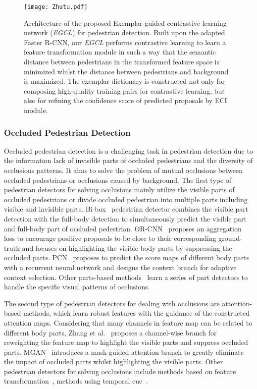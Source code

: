 \documentclass[journal]{IEEEtran}
\begin{document}
\begin{figure*}[t]
\centering
    \texttt{[image: Zhutu.pdf]}
\caption{Architecture of the proposed Exemplar-guided contrastive learning network (\emph{EGCL}) for pedestrian detection. Built upon the adapted Faster R-CNN, our \emph{EGCL} performs contrastive learning to learn a feature transformation module  in such a way that the semantic distance between pedestrians in the transformed feature space is minimized whilst the distance between pedestrians and background is maximized. The exemplar dictionary is constructed not only for composing high-quality training pairs for contrastive learning, but also for refining the confidence score of predicted proposals by ECI module.
}
\label{Fig:Framework}
\end{figure*}

\subsubsection{Occluded Pedestrian Detection}
Occluded pedestrian detection is a challenging task in pedestrian detection due to the information lack of invisible parts of occluded pedestrians and the diversity of occlusions patterns. It aims to solve the problem of mutual occlusions between occluded pedestrians or occlusions caused by background.
The first type of pedestrian detectors for solving occlusions mainly utilize the visible parts of occluded pedestrians or divide occluded pedestrian into multiple parts including visible and invisible parts. Bi-box~\cite{zhou2018bi} pedestrian detector combines the visible part detection with the full-body detection to simultaneously predict the visible part and full-body part of occluded pedestrian. OR-CNN~\cite{zhang2018occlusion} proposes an aggregation loss to encourage positive proposals to be close to their corresponding ground-truth and focuses on highlighting the visible body parts by suppressing the occluded parts. PCN~\cite{wang2018pcn} proposes to predict the score maps of different body parts with a recurrent neural network and designs the context branch for adaptive context selection. Other parts-based methods~\cite{tian2015deep,zhou2017multi} learn a series of part detectors to handle the specific visual patterns of occlusions.

The second type of pedestrian detectors for dealing with occlusions are attention-based methods, which learn robust features with the guidance of the constructed attention maps. Considering that many channels in feature map can be related to different body parts, Zhang et al.~\cite{zhang2018occluded} proposes a channel-wise branch for reweighting the feature map to highlight the visible parts and suppress occluded parts. MGAN~\cite{pang2019mask} introduces a mask-guided attention branch to greatly eliminate the impact of occluded parts whilst highlighting the visible parts. Other pedestrian detectors for solving occlusions include methods based on feature transformation~\cite{zhou2019discriminative}, methods using temporal cue~\cite{wu2020temporal}. 
\end{document}
